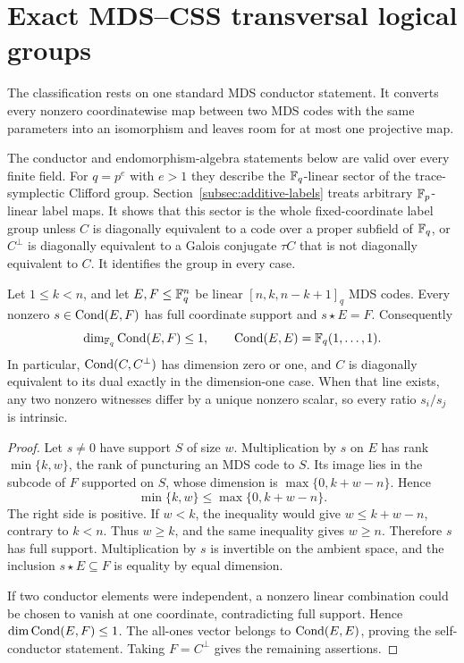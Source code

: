 \section{Exact MDS--CSS transversal logical groups}
\label{sec:exact-logical}

The classification rests on one standard MDS conductor statement.  It
converts every nonzero coordinatewise map between two MDS codes with the same
parameters into an isomorphism and leaves room for at most one projective
map.

The conductor and endomorphism-algebra statements below are valid over every
finite field.  For \(q=p^e\) with \(e>1\) they describe the \(\mathbb F_q\)-linear
sector of the trace-symplectic Clifford group.
Section~\ref{subsec:additive-labels} treats arbitrary \(\mathbb F_p\)-linear label
maps.  It shows that this sector is the whole fixed-coordinate label group
unless \(C\) is diagonally equivalent to a code over a proper subfield of
\(\mathbb F_q\), or \(C^\perp\) is diagonally equivalent to a Galois conjugate
\(\tau C\) that is not diagonally equivalent to \(C\).  It identifies the
group in every case.

\begin{proposition}
\label{prop:diagonal-multiplier-line}
Let \(1\leq k<n\), and let \(E,F\leq\mathbb F_q^n\) be linear
\([n,k,n-k+1]_q\) MDS codes.
Every nonzero \(s\in\operatorname{Cond}(E,F)\) has full coordinate support and
\(s\star E=F\).  Consequently
\[
 \dim_{\mathbb F_q}\operatorname{Cond}(E,F)\leq1,
 \qquad
 \operatorname{Cond}(E,E)=\mathbb F_q(1,\ldots,1).
\]
In particular, \(\operatorname{Cond}(C,C^\perp)\) has dimension zero or one,
and \(C\) is diagonally equivalent to its dual exactly in the
dimension-one case.
When that line exists, any two nonzero witnesses differ by a unique
nonzero scalar, so every ratio \(s_i/s_j\) is intrinsic.
\end{proposition}

\begin{proof}
Let \(s\ne0\) have support \(S\) of size \(w\).  Multiplication by \(s\)
on \(E\) has rank \(\min\{k,w\}\), the rank of puncturing an MDS code to
\(S\).  Its image lies in the subcode of \(F\) supported on \(S\), whose
dimension is \(\max\{0,k+w-n\}\).  Hence
\[
 \min\{k,w\}\leq\max\{0,k+w-n\}.
\]
The right side is positive.  If \(w<k\), the inequality would give
\(w\leq k+w-n\), contrary to \(k<n\).  Thus \(w\geq k\), and the same
inequality gives \(w\geq n\).  Therefore \(s\) has full support.
Multiplication by \(s\) is invertible on the ambient space, and the inclusion
\(s\star E\subseteq F\) is equality by equal dimension.

If two conductor elements were independent, a nonzero linear combination could
be chosen to vanish at one coordinate, contradicting full support.
Hence \(\dim\operatorname{Cond}(E,F)\leq1\).  The all-ones vector belongs to
\(\operatorname{Cond}(E,E)\), proving the self-conductor statement.  Taking
\(F=C^\perp\) gives the remaining assertions.
\end{proof}

